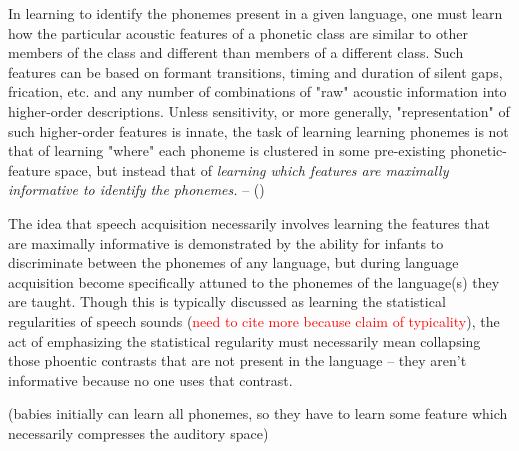 \begin{multicols}{2}
In learning to identify the phonemes present in a given language, one must learn how the particular acoustic features of a phonetic class are similar to other members of the class and different than members of a different class. Such features can be based on formant transitions, timing and duration of silent gaps, frication, etc. and any number of combinations of "raw" acoustic information into higher-order descriptions. Unless sensitivity, or more generally, "representation" of such higher-order features is innate, the task of learning learning phonemes is not that of learning "where" each phoneme is clustered in some pre-existing phonetic-feature space, but instead that of \textit{learning which features are maximally informative to identify the phonemes.}\cite{kluenderLongstandingProblemsSpeech2019a} -- ()

The idea that speech acquisition necessarily involves learning the features that are maximally informative is demonstrated by the ability for infants to discriminate between the phonemes of any language, but during language acquisition become specifically attuned to the phonemes of the language(s) they are taught. Though this is typically discussed as learning the statistical regularities of speech  sounds (\textcolor{red}{need to cite more because claim of typicality}\cite{kuhlPhoneticLearningPathway2008}\cite{kuhlEarlyLanguageAcquisition2004}), the act of emphasizing the statistical regularity must necessarily mean collapsing those phoentic contrasts that are not present in the language -- they aren't informative because no one uses that contrast. 


(babies initially can learn all phonemes\cite{kuhlEarlyLanguageAcquisition2004}, so they have to learn some feature which necessarily compresses the auditory space\cite{ForeignlanguageExperienceInfancy})


\end{multicols}
